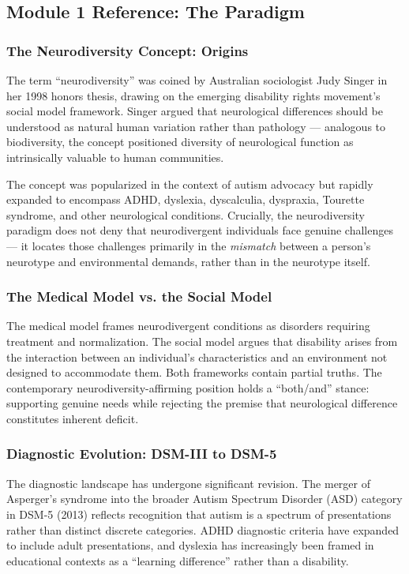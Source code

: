 \documentclass[11pt,letterpaper]{article}
\begin{document}
\subsection{Module 1 Reference: The Paradigm}

\subsubsection{The Neurodiversity Concept: Origins}

The term ``neurodiversity'' was coined by Australian sociologist Judy Singer in her 1998 honors thesis, drawing on the emerging disability rights movement's social model framework. Singer argued that neurological differences should be understood as natural human variation rather than pathology --- analogous to biodiversity, the concept positioned diversity of neurological function as intrinsically valuable to human communities.

The concept was popularized in the context of autism advocacy but rapidly expanded to encompass ADHD, dyslexia, dyscalculia, dyspraxia, Tourette syndrome, and other neurological conditions. Crucially, the neurodiversity paradigm does not deny that neurodivergent individuals face genuine challenges --- it locates those challenges primarily in the \textit{mismatch} between a person's neurotype and environmental demands, rather than in the neurotype itself.

\subsubsection{The Medical Model vs. the Social Model}

The medical model frames neurodivergent conditions as disorders requiring treatment and normalization. The social model argues that disability arises from the interaction between an individual's characteristics and an environment not designed to accommodate them. Both frameworks contain partial truths. The contemporary neurodiversity-affirming position holds a ``both/and'' stance: supporting genuine needs while rejecting the premise that neurological difference constitutes inherent deficit.

\subsubsection{Diagnostic Evolution: DSM-III to DSM-5}

The diagnostic landscape has undergone significant revision. The merger of Asperger's syndrome into the broader Autism Spectrum Disorder (ASD) category in DSM-5 (2013) reflects recognition that autism is a spectrum of presentations rather than distinct discrete categories. ADHD diagnostic criteria have expanded to include adult presentations, and dyslexia has increasingly been framed in educational contexts as a ``learning difference'' rather than a disability.
\end{document}
